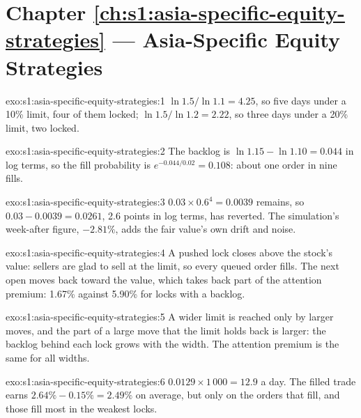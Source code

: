 \section*{Chapter \ref{ch:s1:asia-specific-equity-strategies} --- Asia-Specific Equity Strategies}

\begin{solution}{exo:s1:asia-specific-equity-strategies:1}
$\ln 1.5/\ln 1.1 = 4.25$, so five days under a 10\% limit, four of them locked; $\ln 1.5/\ln 1.2 = 2.22$, so three days under a 20\% limit, two locked.
\end{solution}

\begin{solution}{exo:s1:asia-specific-equity-strategies:2}
The backlog is $\ln 1.15 - \ln 1.10 = 0.044$ in log terms, so the fill probability is $e^{-0.044/0.02} = 0.108$: about one order in nine fills.
\end{solution}

\begin{solution}{exo:s1:asia-specific-equity-strategies:3}
$0.03 \times 0.6^4 = 0.0039$ remains, so $0.03 - 0.0039 = 0.0261$, 2.6 points in log terms, has reverted. The simulation's week-after figure, $-2.81\%$,
adds the fair value's own drift and noise.
\end{solution}

\begin{solution}{exo:s1:asia-specific-equity-strategies:4}
A pushed lock closes above the stock's value: sellers are glad to sell at the limit, so every queued order fills. The next open moves back toward the
value, which takes back part of the attention premium: 1.67\% against 5.90\% for locks with a backlog.
\end{solution}

\begin{solution}{exo:s1:asia-specific-equity-strategies:5}
A wider limit is reached only by larger moves, and the part of a large move that the limit holds back is larger: the backlog behind each lock grows with
the width. The attention premium is the same for all widths.
\end{solution}

\begin{solution}{exo:s1:asia-specific-equity-strategies:6}
$0.0129 \times 1\,000 = 12.9$ a day. The filled trade earns $2.64\% - 0.15\% = 2.49\%$ on average, but only on the orders that fill, and those fill most
in the weakest locks.
\end{solution}

